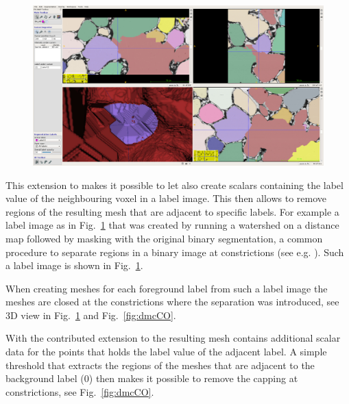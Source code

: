 \documentclass{InsightArticle}
\begin{document}
\begin{figure}[!b]
\center
\includegraphics[width=\textwidth]{images/vtkDiscreteMarchingCubes_extension_07}
\label{fig:labelimage}
\end{figure}


This extension to  makes it possible to let  also create  scalars containing the label value of the neighbouring voxel in a label image. This then allows to remove regions of the resulting mesh that are adjacent to specific labels. For example a label image as in Fig.~\ref{fig:labelimage} that was created by running a watershed on a distance map followed by masking with the original binary segmentation, a common procedure to separate regions in a binary image at constrictions (see e.g. \citet{Beare2006b}). Such a label image is shown in Fig.~\ref{fig:labelimage}.

When creating meshes for each foreground label from such a label image the meshes are closed at the constrictions where the separation was introduced, see 3D view in Fig.~\ref{fig:labelimage} and Fig.~\ref{fig:dmcCO}.

With the contributed extension to  the resulting mesh contains additional scalar data for the points that holds the label value of the adjacent label. A simple threshold that extracts the regions of the meshes that are adjacent to the background label (0) then makes it possible to remove the capping at constrictions, see Fig.~\ref{fig:dmcCO}.
\end{document}
